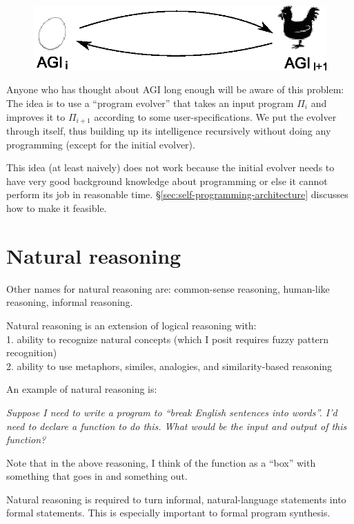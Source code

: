 \begin{figure}[H]
\centering
\includegraphics{chicken-and-egg1.eps}
\end{figure}
\vspace{-0.5cm}

Anyone who has thought about AGI long enough will be aware of this problem:  The idea is to use a ``program evolver'' that takes an input program $\Pi_i$ and improves it to $\Pi_{i+1}$ according to some user-specifications.  We put the evolver through itself, thus building up its intelligence recursively without doing any programming (except for the initial evolver).

This idea (at least naively) does not work because the initial evolver needs to have very good background knowledge about programming or else it cannot perform its job in reasonable time.  \S\ref{sec:self-programming-architecture} discusses how to make it feasible.

\section{Natural reasoning}
\label{sec:natural-reasoning}

Other names for natural reasoning are: common-sense reasoning, human-like reasoning, informal reasoning.

Natural reasoning is an extension of logical reasoning with:\\
1.  ability to recognize natural concepts (which I posit requires fuzzy pattern recognition)\\
2.  ability to use metaphors, similes, analogies, and similarity-based reasoning

An example of natural reasoning is:

\leftskip 1cm \textit{Suppose I need to write a program to ``break English sentences into words''.  I'd need to declare a function to do this.  What would be the input and output of this function?}

\leftskip 0cm Note that in the above reasoning, I think of the function as a ``box'' with something that goes in and something out.

Natural reasoning is required to turn informal, natural-language statements into formal statements.  This is especially important to formal program synthesis.
